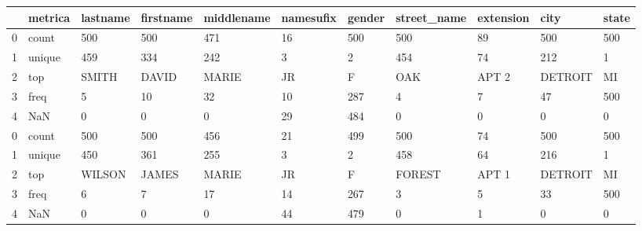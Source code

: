 \begin{tabular}{lllllllllll}
\toprule
{} & metrica & lastname & firstname & middlename & namesufix & gender & street\_name & extension &     city & state \\
\midrule
0 &   count &      500 &       500 &        471 &        16 &    500 &         500 &        89 &      500 &   500 \\
1 &  unique &      459 &       334 &        242 &         3 &      2 &         454 &        74 &      212 &     1 \\
2 &     top &    SMITH &     DAVID &      MARIE &        JR &      F &         OAK &     APT 2 &  DETROIT &    MI \\
3 &    freq &        5 &        10 &         32 &        10 &    287 &           4 &         7 &       47 &   500 \\
4 &     NaN &        0 &         0 &          0 &        29 &    484 &           0 &         0 &        0 &     0 \\
0 &   count &      500 &       500 &        456 &        21 &    499 &         500 &        74 &      500 &   500 \\
1 &  unique &      450 &       361 &        255 &         3 &      2 &         458 &        64 &      216 &     1 \\
2 &     top &   WILSON &     JAMES &      MARIE &        JR &      F &      FOREST &     APT 1 &  DETROIT &    MI \\
3 &    freq &        6 &         7 &         17 &        14 &    267 &           3 &         5 &       33 &   500 \\
4 &     NaN &        0 &         0 &          0 &        44 &    479 &           0 &         1 &        0 &     0 \\
\bottomrule
\end{tabular}

